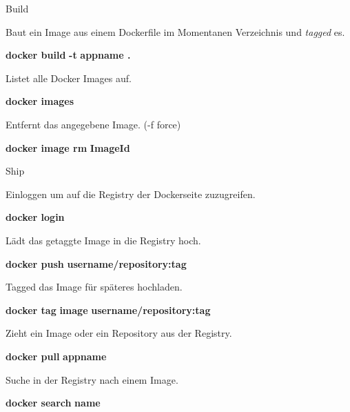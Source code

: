 \documentclass[final]{beamer}
\newlength{\specialcolwid}
\begin{document}
\begin{frame}
\begin{columns}[t]
\begin{column}{\specialcolwid}
\begin{block}{Build}

\par Baut ein Image aus einem Dockerfile im Momentanen Verzeichnis und \textit{tagged} es.

\par \textbf{docker build} \textcolor{docker-pu}{\textbf{-t}} \textcolor{docker-lb}{\textbf{appname .}}

\vspace{1cm}
\par Listet alle Docker Images auf.
\par \textbf{docker images}

\vspace{1cm}
\par Entfernt das angegebene Image. (-f force)
\par \textbf{docker image rm} \textcolor{docker-lb}{\textbf{ImageId}}

\end{block}

\begin{block}{Ship}

\par Einloggen um auf die Registry der Dockerseite zuzugreifen.
\par \textbf{docker login}

\vspace{1cm}
\par Lädt das getaggte Image in die Registry hoch.
\par \textbf{docker push} \textcolor{docker-lb}{\textbf{username/repository:tag}}

\vspace{1cm}
\par Tagged das Image für späteres hochladen.
\par \textbf{docker tag } \textcolor{docker-lb}{\textbf{image}} \textcolor{docker-lb}{\textbf{username/repository:tag}}

\vspace{1cm}
\par Zieht ein Image oder ein Repository aus der Registry.
\par \textbf{docker pull} \textcolor{docker-lb}{\textbf{appname}}

\vspace{1cm}
\par Suche in der Registry nach einem Image.
\par \textbf{docker search} \textcolor{docker-lb}{\textbf{name}}



\end{block}
\end{column}
\end{columns}
\end{frame}
\end{document}
